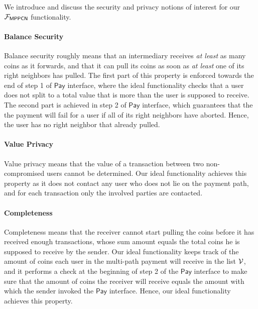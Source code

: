 We introduce and discuss the security and privacy notions of interest for our 
$\mathcal{F}_{\mathsf{MPPCN}}$ functionality.

\paragraph{Balance Security}
Balance security roughly means that an intermediary receives \emph{at least} as many coins as 
it forwards, and that it can pull its coins as soon as \emph{at least} one of its right 
neighbors has pulled. The first part of this property is enforced towards the end of step 1 of 
$\mathsf{Pay}$ interface, where the ideal functionality checks that a user does not split to a 
total value that is more than the user is supposed to receive. The second part is achieved in 
step 2 of $\mathsf{Pay}$ interface, which guarantees that the the payment will fail for 
a user if all of its right neighbors have aborted. Hence, the user has no right neighbor 
that already pulled.

\paragraph{Value Privacy}
Value privacy means that the value of a transaction between two non-compromised users cannot 
be determined. Our ideal functionality achieves this property as it does not contact any user 
who does not lie on the payment path, and for each transaction only the involved parties are 
contacted. 


\paragraph{Completeness}
Completeness means that the receiver cannot start pulling the coins before it has received 
enough transactions, whose sum amount equals the total coins he is supposed to receive by 
the sender. Our ideal functionality keeps track of the amount of coins each user in the 
multi-path payment will receive in the list $\mathcal{V}$, and it performs a check at the beginning of 
step 2 of the $\mathsf{Pay}$ interface to make sure that the amount of coins the receiver will 
receive equals the amount with which the sender invoked the $\mathsf{Pay}$ interface. Hence, our 
ideal functionality achieves this property.


